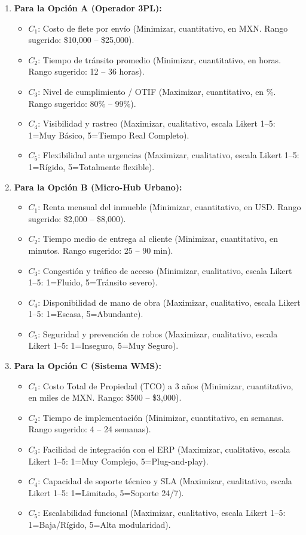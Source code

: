 \documentclass[11pt,a4paper]{article}
\begin{document}
\begin{enumerate}
  \item \textbf{Para la Opción A (Operador 3PL):}
    \begin{itemize}
      \item $C_1$: Costo de flete por envío (Minimizar, cuantitativo, en MXN. Rango sugerido: \$10,000 -- \$25,000).
      \item $C_2$: Tiempo de tránsito promedio (Minimizar, cuantitativo, en horas. Rango sugerido: 12 -- 36 horas).
      \item $C_3$: Nivel de cumplimiento / OTIF (Maximizar, cuantitativo, en \%. Rango sugerido: 80\% -- 99\%).
      \item $C_4$: Visibilidad y rastreo (Maximizar, cualitativo, escala Likert 1--5: 1=Muy Básico, 5=Tiempo Real Completo).
      \item $C_5$: Flexibilidad ante urgencias (Maximizar, cualitativo, escala Likert 1--5: 1=Rígido, 5=Totalmente flexible).
    \end{itemize}
    
  \item \textbf{Para la Opción B (Micro-Hub Urbano):}
    \begin{itemize}
      \item $C_1$: Renta mensual del inmueble (Minimizar, cuantitativo, en USD. Rango sugerido: \$2,000 -- \$8,000).
      \item $C_2$: Tiempo medio de entrega al cliente (Minimizar, cuantitativo, en minutos. Rango sugerido: 25 -- 90 min).
      \item $C_3$: Congestión y tráfico de acceso (Minimizar, cualitativo, escala Likert 1--5: 1=Fluido, 5=Tránsito severo).
      \item $C_4$: Disponibilidad de mano de obra (Maximizar, cualitativo, escala Likert 1--5: 1=Escasa, 5=Abundante).
      \item $C_5$: Seguridad y prevención de robos (Maximizar, cualitativo, escala Likert 1--5: 1=Inseguro, 5=Muy Seguro).
    \end{itemize}

  \item \textbf{Para la Opción C (Sistema WMS):}
    \begin{itemize}
      \item $C_1$: Costo Total de Propiedad (TCO) a 3 años (Minimizar, cuantitativo, en miles de MXN. Rango: \$500 -- \$3,000).
      \item $C_2$: Tiempo de implementación (Minimizar, cuantitativo, en semanas. Rango sugerido: 4 -- 24 semanas).
      \item $C_3$: Facilidad de integración con el ERP (Maximizar, cualitativo, escala Likert 1--5: 1=Muy Complejo, 5=Plug-and-play).
      \item $C_4$: Capacidad de soporte técnico y SLA (Maximizar, cualitativo, escala Likert 1--5: 1=Limitado, 5=Soporte 24/7).
      \item $C_5$: Escalabilidad funcional (Maximizar, cualitativo, escala Likert 1--5: 1=Baja/Rígido, 5=Alta modularidad).
    \end{itemize}
\end{enumerate}
\end{document}
